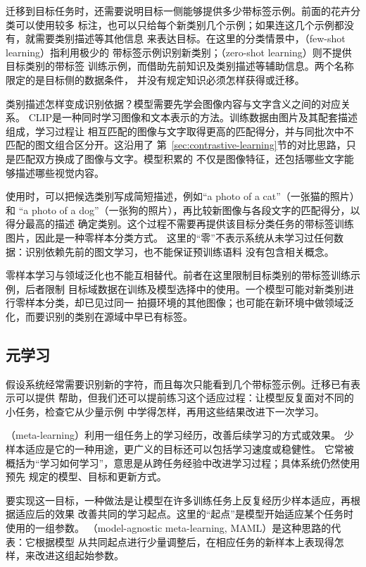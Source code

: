 迁移到目标任务时，还需要说明目标一侧能够提供多少带标签示例。前面的花卉分类可以使用较多
标注，也可以只给每个新类别几个示例；如果连这几个示例都没有，就需要类别描述等其他信息
来表达目标。在这里的分类情景中，（few-shot learning）指利用极少的
带标签示例识别新类别；（zero-shot learning）则不提供目标类别的带标签
训练示例，而借助先前知识及类别描述等辅助信息。两个名称限定的是目标侧的数据条件，
并没有规定知识必须怎样获得或迁移。

类别描述怎样变成识别依据？模型需要先学会图像内容与文字含义之间的对应关系。
CLIP是一种同时学习图像和文本表示的方法。训练数据由图片及其配套描述组成，学习过程让
相互匹配的图像与文字取得更高的匹配得分，并与同批次中不匹配的图文组合区分开。这沿用了
第~\ref{sec:contrastive-learning}节的对比思路，只是匹配双方换成了图像与文字。模型积累的
不仅是图像特征，还包括哪些文字能够描述哪些视觉内容。

使用时，可以把候选类别写成简短描述，例如“a photo of a cat”（一张猫的照片）和
“a photo of a dog”（一张狗的照片），再比较新图像与各段文字的匹配得分，以得分最高的描述
确定类别。这个过程不需要再提供该目标分类任务的带标签训练图片，因此是一种零样本分类方式。
这里的“零”不表示系统从未学习过任何数据：识别依赖先前的图文学习，也不能保证预训练语料
没有包含相关概念。

零样本学习与领域泛化也不能互相替代。前者在这里限制目标类别的带标签训练示例，后者限制
目标域数据在训练及模型选择中的使用。一个模型可能对新类别进行零样本分类，却已见过同一
拍摄环境的其他图像；也可能在新环境中做领域泛化，而要识别的类别在源域中早已有标签。

\subsection{元学习}
\label{sec:meta-learning}

假设系统经常需要识别新的字符，而且每次只能看到几个带标签示例。迁移已有表示可以提供
帮助，但我们还可以提前练习这个适应过程：让模型反复面对不同的小任务，检查它从少量示例
中学得怎样，再用这些结果改进下一次学习。

（meta-learning）利用一组任务上的学习经历，改善后续学习的方式或效果。
少样本适应是它的一种用途，更广义的目标还可以包括学习速度或稳健性。
它常被概括为“学习如何学习”，意思是从跨任务经验中改进学习过程；具体系统仍然使用预先
规定的模型、目标和更新方式。

要实现这一目标，一种做法是让模型在许多训练任务上反复经历少样本适应，再根据适应后的效果
改善共同的学习起点。这里的“起点”是模型开始适应某个任务时使用的一组参数。
（model-agnostic meta-learning, MAML）是这种思路的代表：它根据模型
从共同起点进行少量调整后，在相应任务的新样本上表现得怎样，来改进这组起始参数。

